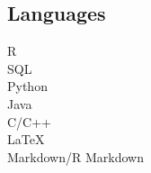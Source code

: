 \documentclass[letterpaper]{deedy-resume} %
\begin{document}
\begin{minipage}[t]{0.33\textwidth}
\sectionspace %
\vspace{3pt}
\subsection{Languages}
R\\
SQL\\
\vspace{3pt}
Python\\
Java\\
C/C++\\
\vspace{3pt}
\LaTeX\\
Markdown/R Markdown



\end{minipage} %
\hfill
%
%
\end{document}
